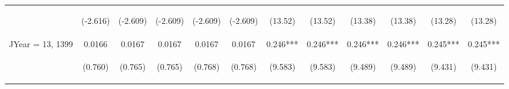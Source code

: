 \documentclass[]{article}
\begin{document}
\begin{center}
\begin{tabular}{lccccccccccc}
\vspace{4pt} & \begin{footnotesize}(-2.616)\end{footnotesize} & \begin{footnotesize}(-2.609)\end{footnotesize} & \begin{footnotesize}(-2.609)\end{footnotesize} & \begin{footnotesize}(-2.609)\end{footnotesize} & \begin{footnotesize}(-2.609)\end{footnotesize} & \begin{footnotesize}(13.52)\end{footnotesize} & \begin{footnotesize}(13.52)\end{footnotesize} & \begin{footnotesize}(13.38)\end{footnotesize} & \begin{footnotesize}(13.38)\end{footnotesize} & \begin{footnotesize}(13.28)\end{footnotesize} & \begin{footnotesize}(13.28)\end{footnotesize} \\
JYear = 13, 1399 & 0.0166 & 0.0167 & 0.0167 & 0.0167 & 0.0167 & 0.246*** & 0.246*** & 0.246*** & 0.246*** & 0.245*** & 0.245*** \\
\vspace{4pt} & \begin{footnotesize}(0.760)\end{footnotesize} & \begin{footnotesize}(0.765)\end{footnotesize} & \begin{footnotesize}(0.765)\end{footnotesize} & \begin{footnotesize}(0.768)\end{footnotesize} & \begin{footnotesize}(0.768)\end{footnotesize} & \begin{footnotesize}(9.583)\end{footnotesize} & \begin{footnotesize}(9.583)\end{footnotesize} & \begin{footnotesize}(9.489)\end{footnotesize} & \begin{footnotesize}(9.489)\end{footnotesize} & \begin{footnotesize}(9.431)\end{footnotesize} & \begin{footnotesize}(9.431)\end{footnotesize} \\

\end{tabular}
\end{center}
\end{document}
